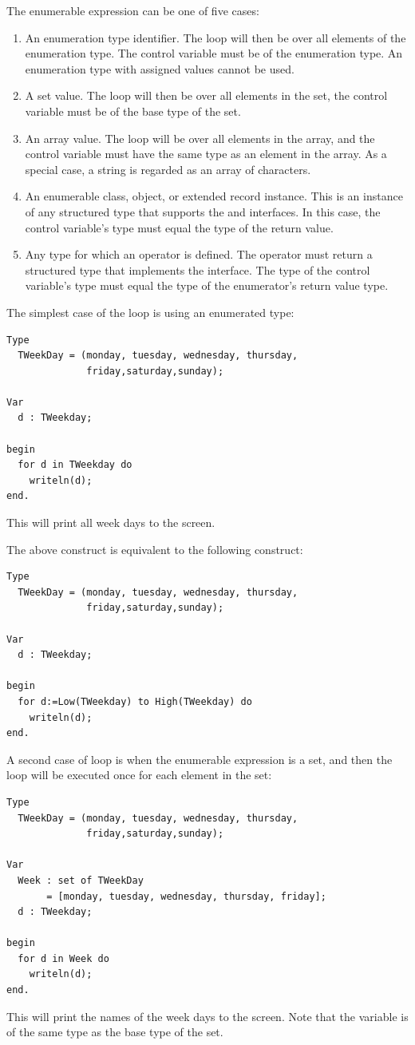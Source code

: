 The enumerable expression can be one of five cases:
\begin{enumerate}
\item An enumeration type identifier. The loop will then be over all
elements of the enumeration type. The control variable must be of the
enumeration type. An enumeration type with assigned values cannot be used. 
\item A set value. The loop will then be over all elements in the set, the
control variable must be of the base type of the set.
\item An array value. The loop will be over all elements in the array, and
the control variable must have the same type as an element in the array.
As a special case, a string is regarded as an array of characters.
\item An enumerable class, object, or extended record instance. This is an instance of any
structured type that supports the  and  interfaces.
In this case, the control variable's type must equal the type of the
 return value.
\item Any type for which an  operator is defined. The
 operator must return a structured type that implements the
 interface. The type of the control variable's type
must equal the type of the enumerator's  return
value type.
\end{enumerate}

The simplest case of the  loop is using an enumerated type:
\begin{verbatim}
Type
  TWeekDay = (monday, tuesday, wednesday, thursday,
              friday,saturday,sunday);

Var
  d : TWeekday;

begin
  for d in TWeekday do
    writeln(d);
end.
\end{verbatim}
This will print all week days to the screen.

The above  construct is equivalent to the following
 construct:
\begin{verbatim}
Type
  TWeekDay = (monday, tuesday, wednesday, thursday,
              friday,saturday,sunday);

Var
  d : TWeekday;

begin
  for d:=Low(TWeekday) to High(TWeekday) do
    writeln(d);
end.
\end{verbatim}

A second case of  loop is when the enumerable expression is a set,
and then the loop will be executed once for each element in the set:
\begin{verbatim}
Type
  TWeekDay = (monday, tuesday, wednesday, thursday,
              friday,saturday,sunday);

Var
  Week : set of TWeekDay
       = [monday, tuesday, wednesday, thursday, friday];
  d : TWeekday;

begin
  for d in Week do
    writeln(d);
end.
\end{verbatim}
This will print the names of the week days to the screen. Note that the
variable  is of the same type as the base type of the set.

